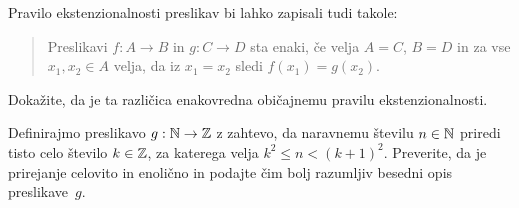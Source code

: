 \begin{vaja}
  Pravilo ekstenzionalnosti preslikav bi lahko zapisali tudi takole:
  \begin{quote}
    Preslikavi $f : A \to B$ in $g : C \to D$ sta enaki, če velja $A = C$, $B = D$ in za
    vse $x_1, x_2 \in A$ velja, da iz $x_1 = x_2$ sledi $f(x_1) = g(x_2)$.
  \end{quote}
  Dokažite, da je ta različica enakovredna običajnemu pravilu ekstenzionalnosti.
\end{vaja}

\begin{vaja}
 Definirajmo preslikavo $g : \mathbb{N} \to \mathbb{Z}$ z zahtevo, da naravnemu številu $n \in \mathbb{N}$ priredi tisto celo število $k \in \mathbb{Z}$, za katerega velja $k^2 \leq n < (k+1)^2$.
 Preverite, da je prirejanje celovito in enolično in podajte čim bolj razumljiv besedni opis preslikave~$g$.
\end{vaja}
